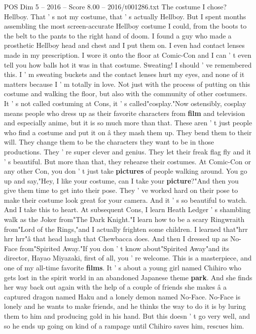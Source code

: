 \begin{textsample}{POS Dim 5 – 2016 – Score 8.00 – 2016/t001286.txt}
The costume I chose?
Hellboy.
That ' s not my costume, that ' s actually Hellboy.
But I spent months assembling the most screen-accurate Hellboy costume I could, from the boots to the belt to the pants to the right hand of doom.
I found a guy who made a prosthetic Hellboy head and chest and I put them on.
I even had contact lenses made in my prescription.
I wore it onto the floor at Comic-Con and I can ' t even tell you how balls hot it was in that costume.
Sweating!
I should ' ve remembered this.
I ' m sweating buckets and the contact lenses hurt my eyes, and none of it matters because I ' m totally in love.
Not just with the process of putting on this costume and walking the floor, but also with the community of other costumers.
It ' s not called costuming at Cons, it ' s called"cosplay."Now ostensibly, cosplay means people who dress up as their favorite characters from \textbf{film} and television and especially anime, but it is so much more than that.
These aren ' t just people who find a costume and put it on â they mash them up.
They bend them to their will.
They change them to be the characters they want to be in those productions.
They ' re super clever and genius.
They let their freak flag fly and it ' s beautiful.
But more than that, they rehearse their costumes.
At Comic-Con or any other Con, you don ' t just take \textbf{pictures} of people walking around.
You go up and say,"Hey, I like your costume, can I take your \textbf{picture}?"And then you give them time to get into their pose.
They ' ve worked hard on their pose to make their costume look great for your camera.
And it ' s so beautiful to watch.
And I take this to heart.
At subsequent Cons, I learn Heath Ledger ' s shambling walk as the Joker from"The Dark Knight."I learn how to be a scary Ringwraith from"Lord of the Rings,"and I actually frighten some children.
I learned that"hrr hrr hrr"â that head laugh that Chewbacca does.
And then I dressed up as No-Face from"Spirited Away."If you don ' t know about"Spirited Away"and its director, Hayao Miyazaki, first of all, you ' re welcome.
This is a masterpiece, and one of my all-time favorite \textbf{films}.
It ' s about a young girl named Chihiro who gets lost in the spirit world in an abandoned Japanese theme \textbf{park}.
And she finds her way back out again with the help of a couple of friends she makes â a captured dragon named Haku and a lonely demon named No-Face.
No-Face is lonely and he wants to make friends, and he thinks the way to do it is by luring them to him and producing gold in his hand.
But this doesn ' t go very well, and so he ends up going on kind of a rampage until Chihiro saves him, rescues him.

\end{textsample}
